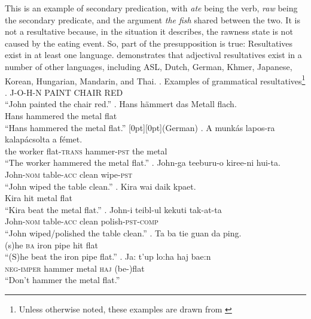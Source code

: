 \documentclass[MilwayThesis]{subfiles}
\begin{document}
This is an example of secondary predication, with \textit{ate} being the verb, \textit{raw} being the secondary predicate, and the argument \textit{the fish} shared between the two.
It is not a resultative because, in the situation it describes, the rawness state is not caused by the eating event.
So, part of the presupposition is true: Resultatives exist in at least one language.
\textcite{snyder1995language,snyder2001nature} demonstrates that adjectival resultatives exist in a number of other languages, including ASL, Dutch, German, Khmer, Japanese, Korean, Hungarian, Mandarin, and Thai.
\ex. Examples of grammatical resultatives\footnote{Unless otherwise noted, these examples are drawn from \textcite{snyder2001nature}}
\a. J-O-H-N PAINT CHAIR RED\hfill\parencite[ASL,][]{kentner2018wh}\\
``John painted the chair red.''
\bg. Hans h\"ammert das Metall flach.\\
Hans hammered the metal flat\\
``Hans hammered the metal flat.'' \hfill \raisebox{1.4\baselineskip}[0pt][0pt]{(German)}
\bg. A munk\'as lapos-ra kalap\'acsolta a f\'emet.\\
the worker flat-\textsc{trans} hammer-\textsc{pst} the metal\\
``The worker hammered the metal flat.'' 
\bg. John-ga teeburu-o kiree-ni hui-ta.\\
John-\textsc{nom} table-\textsc{acc} clean wipe-\textsc{pst}\\
``John wiped the table clean.''
\bg. Kira wai daik kpaet.\\
Kira hit metal flat\\
``Kira beat the metal flat.''
\bg. John-i teibl-ul kekuti tak-at-ta\\
John-\textsc{nom} table-\textsc{acc} clean polish-\textsc{pst}-\textsc{comp}\\
``John wiped/polished the table clean.''
\bg. Ta ba tie guan da ping.\\
(s)he \textsc{ba} iron pipe hit flat\\
``(S)he beat the iron pipe flat.''
\bg. Ja: t'up lo:ha\textglotstop{} haj bae:n\\
\textsc{neg-imper} hammer metal \textsc{haj} (be-)flat\\
``Don't hammer the metal flat.''
\end{document}
